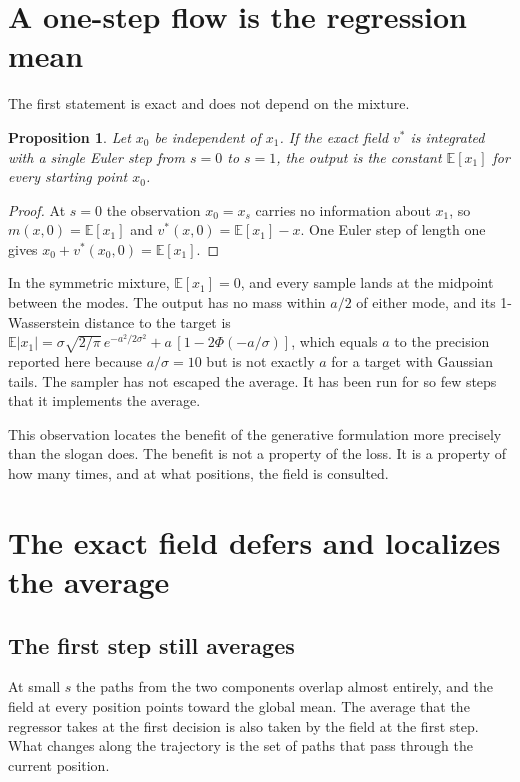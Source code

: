 \documentclass[11pt]{article}
\newtheorem{proposition}{Proposition}
\theoremstyle{definition}
\newcommand{\E}{\mathbb{E}}
\begin{document}
\section{A one-step flow is the regression mean}

The first statement is exact and does not depend on the mixture.

\begin{proposition}
Let $x_0$ be independent of $x_1$. If the exact field $v^\ast$ is integrated with a single Euler step from $s=0$ to $s=1$, the output is the constant $\E[x_1]$ for every starting point $x_0$.
\end{proposition}

\begin{proof}
At $s=0$ the observation $x_{0}=x_s$ carries no information about $x_1$, so $m(x,0)=\E[x_1]$ and $v^\ast(x,0)=\E[x_1]-x$. One Euler step of length one gives $x_0+v^\ast(x_0,0)=\E[x_1]$. \qedhere
\end{proof}

In the symmetric mixture, $\E[x_1]=0$, and every sample lands at the midpoint between the modes. The output has no mass within $a/2$ of either mode, and its 1-Wasserstein distance to the target is $\E|x_1|=\sigma\sqrt{2/\pi}\,e^{-a^2/2\sigma^2}+a\,[1-2\Phi(-a/\sigma)]$, which equals $a$ to the precision reported here because $a/\sigma=10$ but is not exactly $a$ for a target with Gaussian tails. The sampler has not escaped the average. It has been run for so few steps that it implements the average.

This observation locates the benefit of the generative formulation more precisely than the slogan does. The benefit is not a property of the loss. It is a property of how many times, and at what positions, the field is consulted.

\section{The exact field defers and localizes the average}

\subsection{The first step still averages}

At small $s$ the paths from the two components overlap almost entirely, and the field at every position points toward the global mean. The average that the regressor takes at the first decision is also taken by the field at the first step. What changes along the trajectory is the set of paths that pass through the current position.
\end{document}
